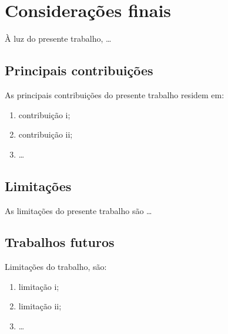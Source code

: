 %
%
%
%

\chapter{Considerações finais}
\label{chapter:chap6}

À luz do presente trabalho, \dots

\section{Principais contribuições}

As principais contribuições do presente trabalho residem em:

\begin{enumerate}[label=\alph*)]
  \tightlist
  \item contribuição i;
  \item contribuição ii;
  \item \dots
\end{enumerate}

\section{Limitações}

As limitações do presente trabalho são \dots

\section{Trabalhos futuros}

Limitações do trabalho, são:

\begin{enumerate}[label=\alph*)]
\tightlist
\item limitação i;
\item limitação ii;
\item \dots
\end{enumerate}
